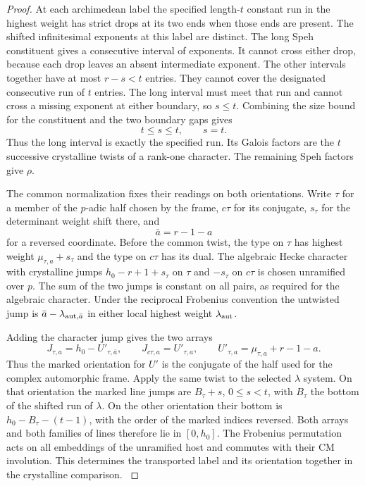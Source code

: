 \begin{proof}
At each
archimedean label the specified length-\(t\) constant
run in the highest weight has strict drops at its two
ends when those ends are present. The shifted
infinitesimal exponents at this label are distinct.
The long Speh constituent gives a consecutive interval
of exponents. It cannot cross either drop, because each
drop leaves an absent intermediate exponent. The other intervals together have at most \(r-s<t\)
entries. They cannot cover the designated consecutive run of
\(t\) entries. The long interval must meet that run and cannot
cross a missing exponent at either boundary, so \(s\le t\).
Combining the size bound for the constituent and the two boundary gaps gives
\[
 t\le s\le t,\qquad s=t.
\]
Thus the long interval is exactly the specified run. Its Galois factors are the \(t\) successive
crystalline twists of a rank-one character. The
remaining Speh factors give \(\rho\).
\label{cor:lift-frame-galois-4}

The common normalization fixes their readings on both
orientations. Write \(\tau\) for a member of the
\(p\)-adic half chosen by the frame, \(c\tau\) for its
conjugate, \(s_\tau\) for the determinant weight shift
there, and
\[
 \bar a=r-1-a
\]
for a reversed coordinate.
Before the common twist, the type on \(\tau\) has highest
weight \(\mu_{\tau,a}+s_\tau\) and the type on \(c\tau\)
has its dual. The algebraic Hecke character with
crystalline jumps \(h_0-r+1+s_\tau\) on \(\tau\) and
\(-s_\tau\) on \(c\tau\) is chosen unramified over \(p\).
The sum of the two jumps is constant on all pairs, as
required for the algebraic character. Under the
reciprocal Frobenius convention the untwisted jump is
\(\bar a-\lambda_{{\rm aut},\bar a}\) in either local
highest weight \(\lambda_{\rm aut}\).

Adding the character
jump gives the two arrays
\[
 J_{\tau,a}=h_0-U'_{\tau,\bar a},\qquad
 J_{c\tau,a}=U'_{\tau,a},\qquad
 U'_{\tau,a}=\mu_{\tau,a}+r-1-a .
\]
Thus the marked orientation for \(U'\) is the conjugate
of the half used for the complex automorphic frame.
Apply the same twist to the selected \(\lambda\) system.
On that orientation the marked line jumps are
\(B_\tau+s\), \(0\le s<t\), with \(B_\tau\) the bottom
of the shifted run of \(\lambda\). On the other orientation
their bottom is \(h_0-B_\tau-(t-1)\), with the order of
the marked indices reversed. Both arrays and both
families of lines therefore lie in \([0,h_0]\).
The Frobenius permutation acts on all embeddings of the
unramified host and commutes with their CM involution.
This determines the transported label and its
orientation together in the crystalline comparison.
\label{cor:lift-frame-galois-5}
\end{proof}
